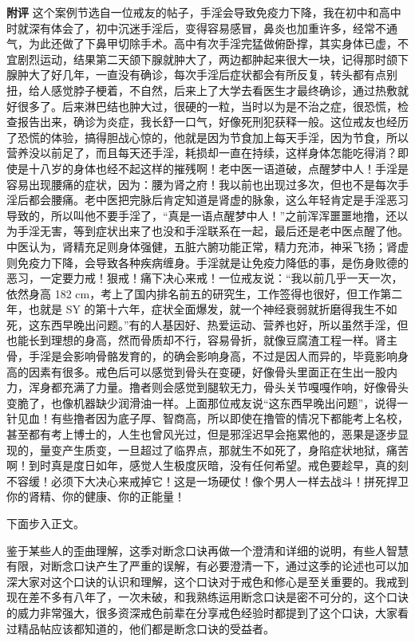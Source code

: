 \begin{case}
    \textbf{附评} 这个案例节选自一位戒友的帖子，手淫会导致免疫力下降，我在初中和高中时就深有体会了，初中沉迷手淫后，变得容易感冒，鼻炎也加重许多，经常不通气，为此还做了下鼻甲切除手术。高中有次手淫完猛做俯卧撑，其实身体已虚，不宜剧烈运动，结果第二天颌下腺就肿大了，两边都肿起来很大一块，记得那时颌下腺肿大了好几年，一直没有确诊，每次手淫后症状都会有所反复，转头都有点别扭，给人感觉脖子梗着，不自然，后来上了大学去看医生才最终确诊，通过热敷就好很多了。后来淋巴结也肿大过，很硬的一粒，当时以为是不治之症，很恐慌，检查报告出来，确诊为炎症，我长舒一口气，好像死刑犯获释一般。这位戒友也经历了恐慌的体验，搞得胆战心惊的，他就是因为节食加上每天手淫，因为节食，所以营养没以前足了，而且每天还手淫，耗损却一直在持续，这样身体怎能吃得消？即使是十八岁的身体也经不起这样的摧残啊！老中医一语道破，点醒梦中人！手淫是容易出现腰痛的症状，因为：腰为肾之府！我以前也出现过多次，但也不是每次手淫后都会腰痛。老中医把完脉后肯定知道是肾虚的脉象，这么年轻肯定是手淫恶习导致的，所以叫他不要手淫了，“真是一语点醒梦中人！”之前浑浑噩噩地撸，还以为手淫无害，等到症状出来了也没和手淫联系在一起，最后还是老中医点醒了他。中医认为，肾精充足则身体强健，五脏六腑功能正常，精力充沛，神采飞扬；肾虚则免疫力下降，会导致各种疾病缠身。手淫就是让免疫力降低的事，是伤身败德的恶习，一定要力戒！狠戒！痛下决心来戒！一位戒友说：“我以前几乎一天一次，依然身高 182 \unit{\cm}，考上了国内排名前五的研究生，工作签得也很好，但工作第二年，也就是 SY 的第十六年，症状全面爆发，就一个神经衰弱就折磨得我生不如死，这东西早晚出问题。”有的人基因好、热爱运动、营养也好，所以虽然手淫，但也能长到理想的身高，然而骨质却不行，容易骨折，就像豆腐渣工程一样。肾主骨，手淫是会影响骨骼发育的，的确会影响身高，不过是因人而异的，毕竟影响身高的因素有很多。戒色后可以感觉到骨头在变硬，好像骨头里面正在生出一股内力，浑身都充满了力量。撸者则会感觉到腿软无力，骨头关节嘎嘎作响，好像骨头变脆了，也像机器缺少润滑油一样。上面那位戒友说“这东西早晚出问题”，说得一针见血！有些撸者因为底子厚、智商高，所以即使在撸管的情况下都能考上名校，甚至都有考上博士的，人生也曾风光过，但是邪淫迟早会拖累他的，恶果是逐步显现的，量变产生质变，一旦超过了临界点，那就生不如死了，身陷症状地狱，痛苦啊！到时真是度日如年，感觉人生极度灰暗，没有任何希望。戒色要趁早，真的刻不容缓！必须下大决心来戒掉它！这是一场硬仗！像个男人一样去战斗！拼死捍卫你的肾精、你的健康、你的正能量！
\end{case}

下面步入正文。

鉴于某些人的歪曲理解，这季对断念口诀再做一个澄清和详细的说明，有些人智慧有限，对断念口诀产生了严重的误解，有必要澄清一下，通过这季的论述也可以加深大家对这个口诀的认识和理解，这个口诀对于戒色和修心是至关重要的。我戒到现在差不多有八年了，一次未破，和我熟练运用断念口诀是密不可分的，这个口诀的威力非常强大，很多资深戒色前辈在分享戒色经验时都提到了这个口诀，大家看过精品帖应该都知道的，他们都是断念口诀的受益者。

